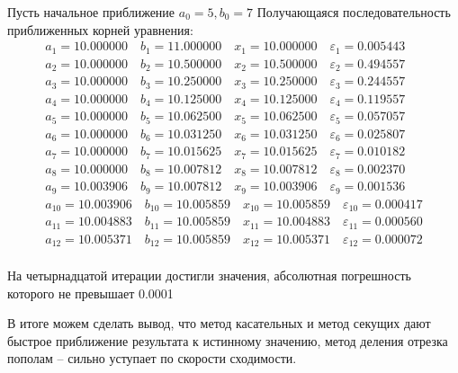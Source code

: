 \documentclass[14pt,a4paper]{scrartcl}
\begin{document}
Пусть начальное приближение $a_0 = 5, b_0 = 7$
Получающаяся последовательность приближенных корней уравнения:
\begin{align*}
	a_{1} =  10.000000 \quad b_{1 }=  11.000000 \quad x_{1} =  10.000000 \quad \varepsilon_{1}=  0.005443 \\
	a_{2} =  10.000000 \quad b_{2 }=  10.500000 \quad x_{2} =  10.500000 \quad \varepsilon_{2}=  0.494557 \\
	a_{3} =  10.000000 \quad b_{3 }=  10.250000 \quad x_{3} =  10.250000 \quad \varepsilon_{3}=  0.244557 \\
	a_{4} =  10.000000 \quad b_{4 }=  10.125000 \quad x_{4} =  10.125000 \quad \varepsilon_{4}=  0.119557 \\
	a_{5} =  10.000000 \quad b_{5 }=  10.062500 \quad x_{5} =  10.062500 \quad \varepsilon_{5}=  0.057057 \\
	a_{6} =  10.000000 \quad b_{6 }=  10.031250 \quad x_{6} =  10.031250 \quad \varepsilon_{6}=  0.025807 \\
	a_{7} =  10.000000 \quad b_{7 }=  10.015625 \quad x_{7} =  10.015625 \quad \varepsilon_{7}=  0.010182 \\
	a_{8} =  10.000000 \quad b_{8 }=  10.007812 \quad x_{8} =  10.007812 \quad \varepsilon_{8}=  0.002370 \\
	a_{9} =  10.003906 \quad b_{9 }=  10.007812 \quad x_{9} =  10.003906 \quad \varepsilon_{9}=  0.001536 \\
	a_{10} =  10.003906 \quad b_{10 }=  10.005859 \quad x_{10} =  10.005859 \quad \varepsilon_{10}=  0.000417 \\
	a_{11} =  10.004883 \quad b_{11 }=  10.005859 \quad x_{11} =  10.004883 \quad \varepsilon_{11}=  0.000560 \\
	a_{12} =  10.005371 \quad b_{12 }=  10.005859 \quad x_{12} =  10.005371 \quad \varepsilon_{12}=  0.000072 \\
\end{align*}

На четырнадцатой итерации достигли значения, абсолютная погрешность которого не превышает 0.0001

В итоге можем сделать вывод, что метод касательных и метод секущих дают быстрое приближение результата к истинному значению, метод деления отрезка пополам -- сильно уступает по скорости сходимости.
\end{document}

